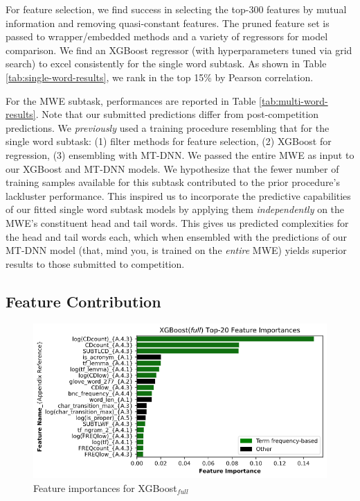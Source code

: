 \documentclass[11pt,a4paper]{article}
\begin{document}
\label{sec:performance}

For feature selection, we find success in selecting the top-300 features by mutual information and removing quasi-constant features. The pruned feature set is passed to wrapper/embedded methods and a variety of regressors for model comparison. We find an XGBoost regressor (with hyperparameters tuned via grid search) to excel consistently for the single word subtask. As shown in Table \ref{tab:single-word-results}, we rank in the top 15\% by Pearson correlation. 

For the MWE subtask, performances are reported in Table \ref{tab:multi-word-results}. Note that our submitted predictions differ from post-competition predictions. We \textit{previously} used a training procedure resembling that for the single word subtask: (1) filter methods for feature selection, (2) XGBoost for regression, (3) ensembling with MT-DNN. We passed the entire MWE as input to our XGBoost and MT-DNN models. We hypothesize that the fewer number of training samples available for this subtask contributed to the prior procedure's lackluster performance. This inspired us to incorporate the predictive capabilities of our fitted single word subtask models by applying them \textit{independently} on the MWE's constituent head and tail words. This gives us predicted complexities for the head and tail words each, which when ensembled with the predictions of our MT-DNN model (that, mind you, is trained on the \textit{entire} MWE) yields superior results to those submitted to competition.

\subsection{Feature Contribution}

\begin{figure}
  \centering
  \includegraphics[scale=0.3]{xgboost_feature_importances.png}
  \captionsetup{justification=centering}
  \caption{\label{fig:xgboost_feature_importance} Feature importances for XGBoost$_\textit{full}$}
\end{figure}
\end{document}
